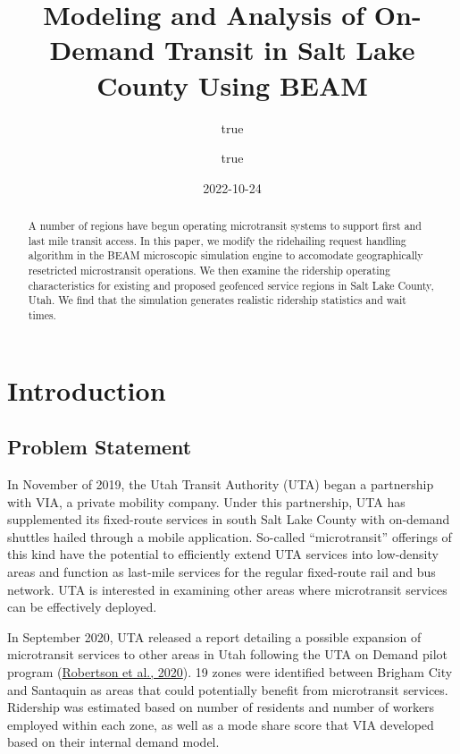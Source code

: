 \documentclass[
]{report}
\title{Modeling and Analysis of On-Demand Transit in Salt Lake County Using BEAM}
\author{true \and true}
\date{2022-10-24}
\begin{document}
\maketitle
\begin{abstract}
A number of regions have begun operating microtransit systems to support first and last mile transit access. In this paper, we modify the ridehailing request handling algorithm in the BEAM microscopic simulation engine to accomodate geographically resetricted microstransit operations. We then examine the ridership operating characteristics for existing and proposed geofenced service regions in Salt Lake County, Utah. We find that the simulation generates realistic ridership statistics and wait times.
\end{abstract}

{
\setcounter{tocdepth}{1}
\tableofcontents
}
\hypertarget{introduction}{%
\chapter{Introduction}\label{introduction}}

\hypertarget{problem-statement}{%
\section{Problem Statement}\label{problem-statement}}

In November of 2019, the Utah Transit Authority (UTA) began a partnership with VIA, a private mobility company. Under this partnership, UTA has supplemented its fixed-route services in south Salt Lake County with on-demand shuttles hailed through a mobile application. So-called ``microtransit'' offerings of this kind have the potential to efficiently extend UTA services into low-density areas and function as last-mile services for the regular fixed-route rail and bus network. UTA is interested in examining other areas where microtransit services can be effectively deployed.

In September 2020, UTA released a report detailing a possible expansion of microtransit services to other areas in Utah following the UTA on Demand pilot program (\protect\hyperlink{ref-UTAreport}{Robertson et al., 2020}). 19 zones were identified between Brigham City and Santaquin as areas that could potentially benefit from microtransit services. Ridership was estimated based on number of residents and number of workers employed within each zone, as well as a mode share score that VIA developed based on their internal demand model.
\end{document}
